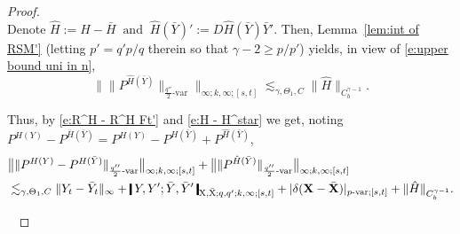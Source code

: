 \documentclass[11pt,reqno]{amsart}
\numberwithin{equation}{section}
\newcommand{\shortthickbar}{%
  \vcenter{\hbox{\rule{1.8pt}{2.2ex}}}%
}
\newcommand{\thicknm}[1]{%
  \mathopen{\shortthickbar}%
  \mkern4mu #1 \mkern4mu%
  \mathclose{\shortthickbar}%
}
\begin{document}
\begin{proof}
\begin{equation}
\end{equation}
Denote
$
\hat H := H - \bar H\ \text{ and }\ \hat H(\bar Y)' := D\hat H(\bar Y) \bar Y'.
$
Then, Lemma~\ref{lem:int of RSM'} (letting $p' = q'p/q$ therein so that $\gamma - 2 \ge p/p'$) yields, in view of \eqref{e:upper bound uni in n}, 
\begin{equation}\label{e:H - H^star}
\big\| \|P^{\hat H(\bar Y)}\|_{\frac{q''}{2}\text{-}\mathrm{var}} \big\|_{\infty;k,\infty;[s,t]} \lesssim_{\gamma,\Theta_{1},C}  \|\hat H\|_{C^{\gamma - 1}_b}. 
\end{equation}

Thus, by \eqref{e:R^H - R^H Ft'} and \eqref{e:H - H^star} we get, noting $P^{H(Y)} - P^{\bar H(\bar Y)} = P^{H(Y)} - P^{H(\bar Y)} + P^{\hat H(\bar Y)}$, 
\begin{equation}\label{e:R^H - R^H Ft''}
\begin{aligned}
&\big\| \|P^{H(Y)} - P^{H(\bar Y)}\|_{\frac{q''}{2}\text{-}\mathrm{var}} \big\|_{\infty;k,\infty;[s,t]} + \big\| \|P^{\hat H(\bar Y)}\|_{\frac{q''}{2}\text{-}\mathrm{var}} \big\|_{\infty;k,\infty;[s,t]}  \\
&\lesssim_{\gamma,\Theta_1,C} \|Y_t - \bar Y_t\|_{\infty} + \thicknm{Y ,Y'; \bar Y, \bar Y'}_{\mathrm X,\bar{\mathrm X};q,q';k,\infty;[s,t]} + |\delta (\mathbf X - \bar{\mathbf X} )|_{p\text{-}\mathrm{var};[s,t]} + \|\hat H\|_{C^{\gamma - 1}_b}. 
\end{aligned}
\end{equation}

\


\end{proof}
\end{document}
